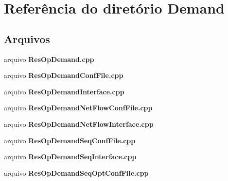 \section{Referência do diretório Demand}
\label{dir_d5da31f0c27b7ba605258a32502dbfcc}
\subsection*{Arquivos}
\begin{DoxyCompactItemize}
\item 
arquivo {\bf Res\+Op\+Demand.\+cpp}
\item 
arquivo {\bf Res\+Op\+Demand\+Conf\+File.\+cpp}
\item 
arquivo {\bf Res\+Op\+Demand\+Interface.\+cpp}
\item 
arquivo {\bf Res\+Op\+Demand\+Net\+Flow\+Conf\+File.\+cpp}
\item 
arquivo {\bf Res\+Op\+Demand\+Net\+Flow\+Interface.\+cpp}
\item 
arquivo {\bf Res\+Op\+Demand\+Seq\+Conf\+File.\+cpp}
\item 
arquivo {\bf Res\+Op\+Demand\+Seq\+Interface.\+cpp}
\item 
arquivo {\bf Res\+Op\+Demand\+Seq\+Opt\+Conf\+File.\+cpp}
\end{DoxyCompactItemize}
